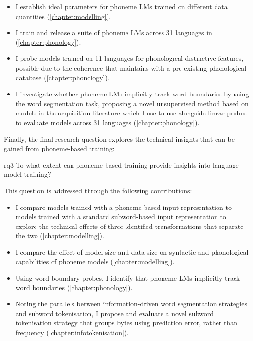 \begin{itemize}
    \item I establish ideal parameters for phoneme LMs trained on different data quantities (\cref{chapter:modelling}).
    \item I train and release a suite of phoneme LMs across 31 languages in \ipachildes (\cref{chapter:phonology}).
    \item I probe models trained on 11 languages for phonological distinctive features, possible due to the coherence that \gpp maintains with a pre-existing phonological database (\cref{chapter:phonology}).
    \item I investigate whether phoneme LMs implicitly track word boundaries by using the word segmentation task, proposing a novel unsupervised method based on models in the acquisition literature which I use to use alongside linear probes to evaluate models across 31 languages (\cref{chapter:phonology}).
\end{itemize}

Finally, the final research question explores the technical insights that can be gained from phoneme-based training:

\begin{question}{}{rq3}
    To what extent can phoneme-based training provide insights into language model training?
\end{question}

This question is addressed through the following contributions:

\begin{itemize}
    \item I compare models trained with a phoneme-based input representation to models trained with a standard subword-based input representation to explore the technical effects of three identified transformations that separate the two (\cref{chapter:modelling}).
    \item I compare the effect of model size and data size on syntactic and phonological capabilities of phoneme models (\cref{chapter:modelling}).
    \item Using word boundary probes, I identify that phoneme LMs implicitly track word boundaries (\cref{chapter:phonology}).
    \item Noting the parallels between information-driven word segmentation strategies and subword tokenisation, I propose and evaluate a novel subword tokenisation strategy that groups bytes using prediction error, rather than frequency (\cref{chapter:infotokenisation}).
\end{itemize}


